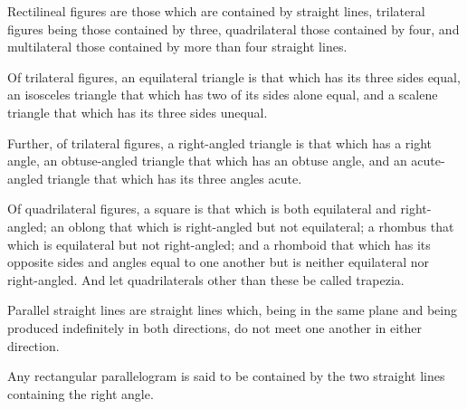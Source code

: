 \begin{scope}
\label{def:I.19}
Rectilineal figures are those which are contained by straight lines,
trilateral figures being those contained by three, quadrilateral those
contained by four, and multilateral those contained by more than four
straight lines.
\end{scope}

\begin{scope}
\label{def:I.20}
Of trilateral figures, an equilateral triangle is that which has its
three sides equal, an isosceles triangle that which has two of its
sides alone equal, and a scalene triangle that which has its three
sides unequal.
\end{scope}

\begin{scope}
\label{def:I.21}
Further, of trilateral figures, a right-angled triangle is that which
has a right angle, an obtuse-angled triangle that which has an obtuse
angle, and an acute-angled triangle that which has its three angles
acute.
\end{scope}

\begin{scope}
\label{def:I.22}
Of quadrilateral figures, a square is that which is both equilateral
and right-angled; an oblong that which is right-angled but not
equilateral; a rhombus that which is equilateral but not right-angled;
and a rhomboid that which has its opposite sides and angles equal to
one another but is neither equilateral nor right-angled. And let
quadrilaterals other than these be called trapezia.
\end{scope}

\begin{scope}
\label{def:I.23}
Parallel straight lines are straight lines which, being in the same
plane and being produced indefinitely in both directions, do not meet
one another in either direction.
\end{scope}


\begin{scope}
\label{def:II.1}
Any rectangular parallelogram is said to be contained by the two
straight lines containing the right angle.
\end{scope}

